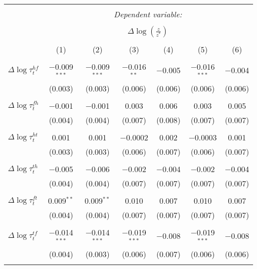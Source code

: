 
\begin{tabular}{@{\extracolsep{5pt}}lcccccc} 
\\[-1.8ex]\hline 
\hline \\[-1.8ex] 
 & \multicolumn{6}{c}{\textit{Dependent variable:}} \\ 
\cline{2-7} 
\\[-1.8ex] & \multicolumn{6}{c}{$\Delta \log \left(\frac{z}{z^*} \right)$} \\ 
\\[-1.8ex] & (1) & (2) & (3) & (4) & (5) & (6)\\ 
\hline \\[-1.8ex] 
 $\Delta \log \tau_t^{hf}$ & $-$0.009$^{***}$ & $-$0.009$^{***}$ & $-$0.016$^{**}$ & $-$0.005 & $-$0.016$^{***}$ & $-$0.004 \\ 
  & (0.003) & (0.003) & (0.006) & (0.006) & (0.006) & (0.006) \\ 
  & & & & & & \\ 
 $\Delta \log \tau_t^{fh}$ & $-$0.001 & $-$0.001 & 0.003 & 0.006 & 0.003 & 0.005 \\ 
  & (0.004) & (0.004) & (0.007) & (0.008) & (0.007) & (0.007) \\ 
  & & & & & & \\ 
 $\Delta \log \tau_t^{ht}$ & 0.001 & 0.001 & $-$0.0002 & 0.002 & $-$0.0003 & 0.001 \\ 
  & (0.003) & (0.003) & (0.006) & (0.007) & (0.006) & (0.007) \\ 
  & & & & & & \\ 
 $\Delta \log \tau_t^{th}$ & $-$0.005 & $-$0.006 & $-$0.002 & $-$0.004 & $-$0.002 & $-$0.004 \\ 
  & (0.004) & (0.004) & (0.007) & (0.007) & (0.007) & (0.007) \\ 
  & & & & & & \\ 
 $\Delta \log \tau_t^{ft}$ & 0.009$^{**}$ & 0.009$^{**}$ & 0.010 & 0.007 & 0.010 & 0.007 \\ 
  & (0.004) & (0.004) & (0.007) & (0.007) & (0.007) & (0.007) \\ 
  & & & & & & \\ 
 $\Delta \log \tau_t^{tf}$ & $-$0.014$^{***}$ & $-$0.014$^{***}$ & $-$0.019$^{***}$ & $-$0.008 & $-$0.019$^{***}$ & $-$0.008 \\ 
  & (0.004) & (0.003) & (0.006) & (0.007) & (0.006) & (0.006) \\ 
  & & & & & & \\ 

\end{tabular}
